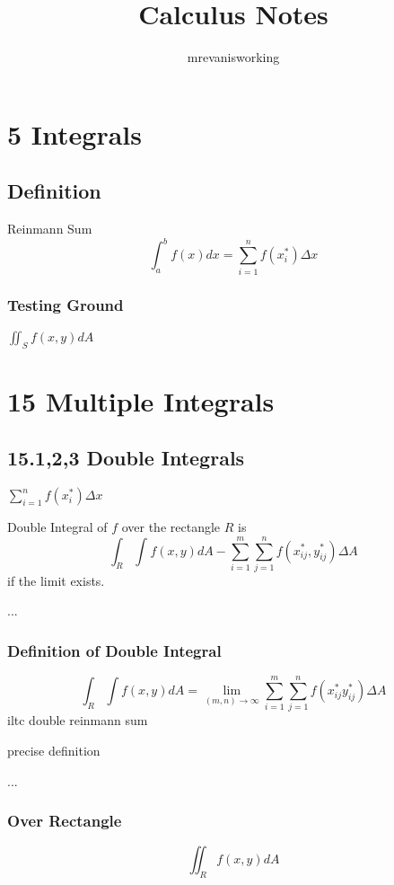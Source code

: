 \documentclass[12pt]{book}%
\begin{document}
\title{Calculus Notes}
\author{mrevanisworking}

\setcounter{chapter}{4}
\chapter{5 Integrals}
\section{Definition}
Reinmann Sum
\begin{equation}
   \int_a^bf(x)dx=\sum_{i=1}^nf(x_i^*)\Delta x 
\end{equation}
\subsection{Testing Ground}


$\iint_{S} f(x,y) dA $   
\setcounter{chapter}{14}
\chapter{15 Multiple Integrals}
\section{15.1,2,3 Double Integrals }

$\sum_{i=1}^{n}f(x_i^*)\Delta x$\par
Double Integral of $f$ over the rectangle $R$ is 
\begin{equation}
    \int_{R}^{} \int_{}^{}f(x,y)dA- \sum_{i=1}^{m} \sum_{j=1}^{n} f(x_{ij}^*,y_{ij}^*)\Delta A 
\end{equation}
if the limit exists.\par
...
\par
\subsection{Definition of Double Integral}
\begin{equation}
    \int_{R} \int f(x,y)dA=\lim_{(m,n)\to\infty} \sum_{i=1}^{m} \sum_{j=1}^{n} f(x_{ij}^*y_{ij}^*)\Delta A
\end{equation}
iltc double reinmann sum\par
precise definition\par...
 
\subsection{Over Rectangle}
\begin{equation}
    \iint_R f(x,y)dA 
\end{equation}
\end{document}
